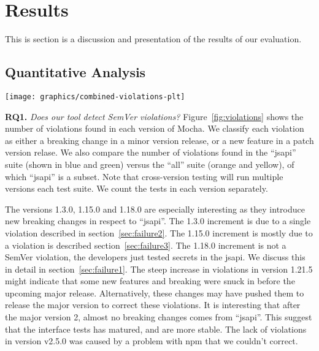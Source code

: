 \section{Results}

This is section is a discussion and presentation of the results of our
evaluation.

\subsection{Quantitative Analysis}

\begin{figure*}
\centering
\texttt{[image: graphics/combined-violations-plt]}
\caption{Violations per version. ``jsapi'' is a subset of violations found in ``all''}
\label{fig:violations}
\end{figure*}

{\bf RQ1.} {\em Does our tool detect SemVer violations?}
Figure~\ref{fig:violations} shows the number of violations found in
each version of Mocha.  We classify each violation as either a
breaking change in a minor version release, or a new feature in a
patch version relase. We also compare the number of violations found
in the ``jsapi'' suite (shown in blue and green) versus the ``all''
suite (orange and yellow), of which ``jsapi'' is a subset. Note that
cross-version testing will run multiple versions each test suite. We
count the tests in each version separately.



The versions 1.3.0, 1.15.0 and 1.18.0 are especially interesting as
they introduce new breaking changes in respect to ``jsapi''.  The
1.3.0 increment is due to a single violation described in
section~\ref{sec:failure2}. The 1.15.0 increment is mostly due to a
violation is described section~\ref{sec:failure3}. The 1.18.0
increment is not a SemVer violation, the developers just tested
secrets in the jsapi.  We discuss this in detail in
section~\ref{sec:failure1}. The steep increase in violations in
version 1.21.5 might indicate that some new features and breaking were
snuck in before the upcoming major release. Alternatively, these
changes may have pushed them to release the major version to correct
these violations. It is interesting that after the major version 2,
almost no breaking changes comes from ``jsapi''. This suggest that the
interface tests has matured, and are more stable. The lack of
violations in version v2.5.0 was caused by a problem with npm that we
couldn't correct.

